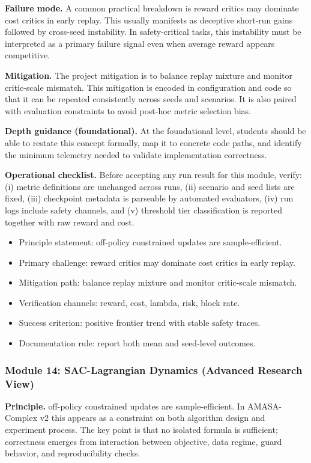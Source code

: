 \documentclass[conference]{IEEEtran}
\begin{document}
\textbf{Failure mode.} A common practical breakdown is reward critics may dominate cost critics in early replay. This usually manifests as deceptive short-run gains followed by cross-seed instability. In safety-critical tasks, this instability must be interpreted as a primary failure signal even when average reward appears competitive.

\textbf{Mitigation.} The project mitigation is to balance replay mixture and monitor critic-scale mismatch. This mitigation is encoded in configuration and code so that it can be repeated consistently across seeds and scenarios. It is also paired with evaluation constraints to avoid post-hoc metric selection bias.

\textbf{Depth guidance (foundational).} At the foundational level, students should be able to restate this concept formally, map it to concrete code paths, and identify the minimum telemetry needed to validate implementation correctness.

\textbf{Operational checklist.} Before accepting any run result for this module, verify: (i) metric definitions are unchanged across runs, (ii) scenario and seed lists are fixed, (iii) checkpoint metadata is parseable by automated evaluators, (iv) run logs include safety channels, and (v) threshold tier classification is reported together with raw reward and cost.

\begin{itemize}[leftmargin=*]
  \item Principle statement: off-policy constrained updates are sample-efficient.
  \item Primary challenge: reward critics may dominate cost critics in early replay.
  \item Mitigation path: balance replay mixture and monitor critic-scale mismatch.
  \item Verification channels: reward, cost, lambda, risk, block rate.
  \item Success criterion: positive frontier trend with stable safety traces.
  \item Documentation rule: report both mean and seed-level outcomes.
\end{itemize}


\subsubsection{Module 14: SAC-Lagrangian Dynamics (Advanced Research View)}
\textbf{Principle.} off-policy constrained updates are sample-efficient. In AMASA-Complex v2 this appears as a constraint on both algorithm design and experiment process. The key point is that no isolated formula is sufficient; correctness emerges from interaction between objective, data regime, guard behavior, and reproducibility checks.
\end{document}
